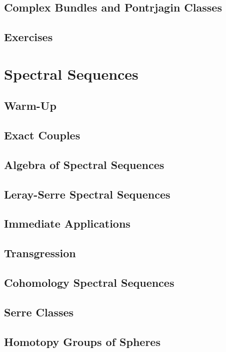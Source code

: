 \subsection{Complex Bundles and Pontrjagin Classes}

\subsection{Exercises}

\section{Spectral Sequences}

\subsection{Warm-Up}

\subsection{Exact Couples}

\subsection{Algebra of Spectral Sequences}

\subsection{Leray-Serre Spectral Sequences}

\subsection{Immediate Applications}

\subsection{Transgression}

\subsection{Cohomology Spectral Sequences}

\subsection{Serre Classes}

\subsection{Homotopy Groups of Spheres}
